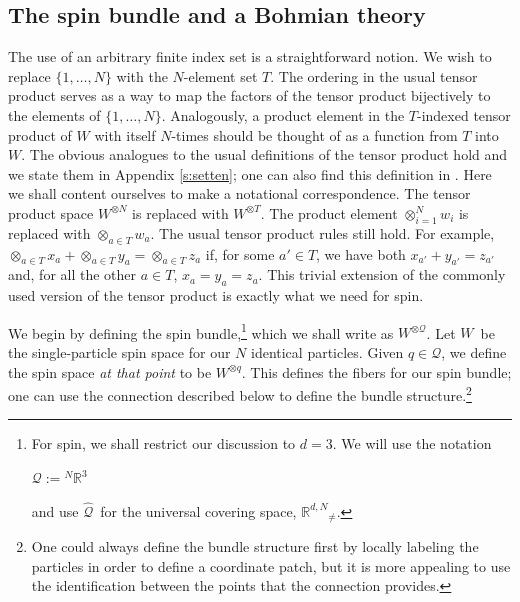\documentclass[11pt]{article}
\theoremstyle{remark}
\begin{document}
\subsection{The spin bundle and a Bohmian theory}
The use of an arbitrary finite index set is a straightforward notion. 
We wish to replace $\{1, \ldots, N\}$ with the $N$-element set
$T$. The ordering in the usual tensor product serves as a way to map
the factors of the tensor product bijectively to the elements of $\{1,
\ldots, N\}$.  Analogously, a product element in the  $T$-indexed tensor
product of $W$ with itself $N$-times 
should be thought of as a function from $T$ into $W$. The obvious
analogues to the usual definitions of the tensor product hold and we
state them in Appendix \ref{s:setten}; one can also find this
definition in  \cite{Bour}. Here we shall content ourselves to make a
notational correspondence. The tensor product space $W^{\otimes N 
}$ is replaced with $W^{\otimes T}$. The product element
$\otimes_{i=1}^N w_i$ is replaced with $\otimes_{a \in T} w_a$. The usual
tensor product rules still hold. For example, 
$ \mathop{\otimes}_{a \in T} x_a + \mathop{\otimes}_{a \in T} y_a = \mathop{\otimes}_{a
\in T} z_a$ 
if, for some $a' \in T$, we have both $x_{a'}
+y_{a'} = z_{a'}$ and, for all the other $a \in T$, 
 $x_a = y_a=z_a$.
This trivial extension of the commonly used version of the tensor 
product is exactly what we need for spin. 
 


We begin by defining the spin bundle,\footnote{For spin, we shall
 restrict our discussion to $d=3$. We will use the
 notation

$\ensuremath{\mathcal{Q}} \ensuremath{:=} \ensuremath{{}^N\ensuremath{\mathbb{R}^{\ensuremath{3}}}} $

and use \ensuremath{\widehat{\ensuremath{\mathcal{Q}}}}\ for the universal covering space, \ensuremath{\ensuremath{\mathbb{R}^{d,N}}_{\neq}}.
  }
which we shall write as
\ensuremath{\ensuremath{W}^{\otimes \ensuremath{\mathcal{Q}}}}. Let \ensuremath{W}\ be the single-particle 
spin space for  
our $N$ identical particles.
 Given $\ensuremath{q}
\in \ensuremath{\mathcal{Q}}$, we define the spin space \emph{at that point} to be
\ensuremath{{\ensuremath{W}}^{{\otimes}{\ensuremath{q}}}}. This defines the fibers for our spin bundle; one can use the
connection described below to define the bundle
structure.\footnote{One could always define the bundle structure first
by locally labeling the particles in order to define a coordinate
  patch, but it is more appealing to use the
identification between the points that the connection provides.}
\end{document}
